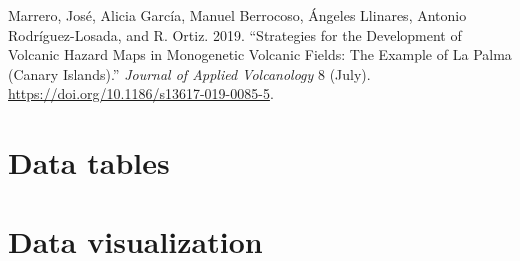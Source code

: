\documentclass[
  letterpaper,
  DIV=11,
  numbers=noendperiod]{scrreprt}
\newlength{\cslhangindent}
\newenvironment{CSLReferences}[2] %
 {\begin{list}{}{%
  \setlength{\itemindent}{0pt}
  \setlength{\leftmargin}{0pt}
  \setlength{\parsep}{0pt}
  \ifodd #1
   \setlength{\leftmargin}{\cslhangindent}
   \setlength{\itemindent}{-1\cslhangindent}
  \fi
  \setlength{\itemsep}{#2\baselineskip}}}
 {\end{list}}
\begin{document}
\label{refs}
\begin{CSLReferences}{1}{0}
Marrero, José, Alicia García, Manuel Berrocoso, Ángeles Llinares,
Antonio Rodríguez-Losada, and R. Ortiz. 2019. {``Strategies for the
Development of Volcanic Hazard Maps in Monogenetic Volcanic Fields: The
Example of {La} {Palma} ({Canary} {Islands}).''} \emph{Journal of
Applied Volcanology} 8 (July).
\url{https://doi.org/10.1186/s13617-019-0085-5}.

\end{CSLReferences}


\chapter{Data tables}\label{data-tables}


\chapter{Data visualization}\label{data-visualization}
\end{document}
